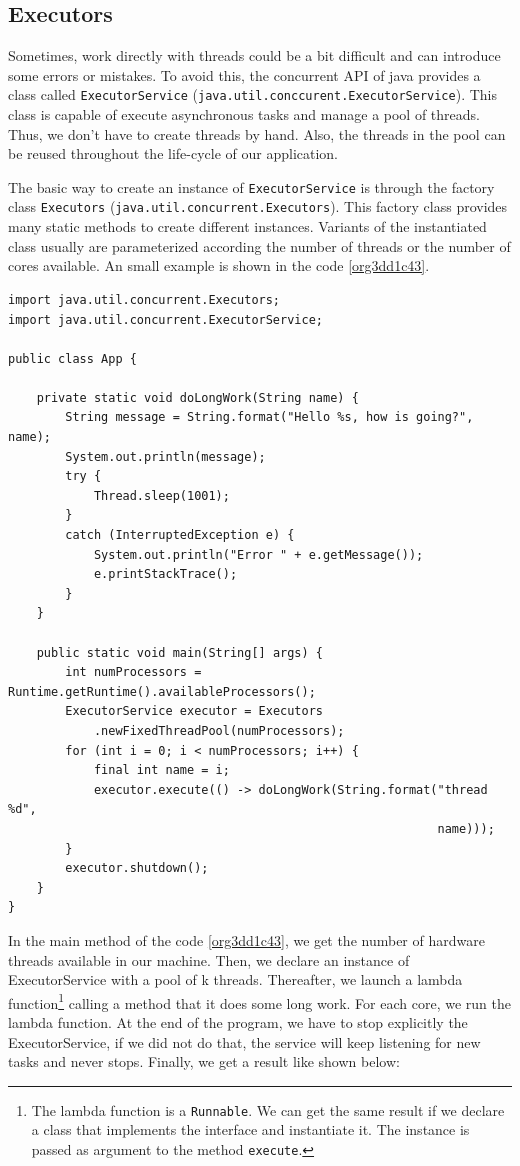 \documentclass{latex/classes/thesis}
\begin{document}
\subsection{Executors}
\label{sec:org47b0dff}

Sometimes, work directly with threads could be a bit difficult and can
introduce some errors or mistakes. To avoid this, the concurrent API of java
provides a class called \texttt{ExecutorService}
(\texttt{java.util.conccurent.ExecutorService}). This class is capable of execute
asynchronous tasks and manage a pool of threads. Thus, we don't have to
create threads by hand. Also, the threads in the pool can be reused
throughout the life-cycle of our application.

The basic way to create an instance of \texttt{ExecutorService} is through the factory
class \texttt{Executors} (\texttt{java.util.concurrent.Executors}). This factory class provides
many static methods to create different instances. Variants of the
instantiated class usually are parameterized according the number of threads
or the number of cores available. An small example is shown in the code
\ref{org3dd1c43}.

\begin{lstlisting}
import java.util.concurrent.Executors;
import java.util.concurrent.ExecutorService;

public class App {

    private static void doLongWork(String name) {
        String message = String.format("Hello %s, how is going?", name);
        System.out.println(message);
        try {
            Thread.sleep(1001);
        }
        catch (InterruptedException e) {
            System.out.println("Error " + e.getMessage());
            e.printStackTrace();
        }
    }

    public static void main(String[] args) {
        int numProcessors = Runtime.getRuntime().availableProcessors();
        ExecutorService executor = Executors
            .newFixedThreadPool(numProcessors);
        for (int i = 0; i < numProcessors; i++) {
            final int name = i;
            executor.execute(() -> doLongWork(String.format("thread %d",
                                                            name)));
        }
        executor.shutdown();
    }
}
\end{lstlisting}

In the main method of the code \ref{org3dd1c43}, we get the number of hardware
threads available in our machine. Then, we declare an instance of
ExecutorService with a pool of k threads. Thereafter, we launch a lambda
function\footnote{The lambda function is a \texttt{Runnable}. We can get the same result if we
declare a class that implements the interface and instantiate it. The instance
is passed as argument to the method \texttt{execute}.} calling a method that it does some long work. For each core,
we run the lambda function. At the end of the program, we have to stop
explicitly the ExecutorService, if we did not do that, the service will keep
listening for new tasks and never stops. Finally, we get a result like shown
below:
\end{document}
